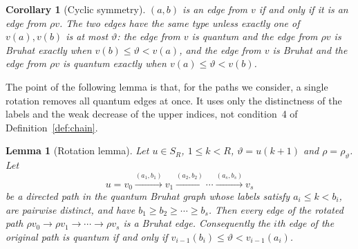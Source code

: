 \documentclass[11pt]{article}
\newtheorem{lemma}[proposition]{Lemma}
\newtheorem{corollary}[proposition]{Corollary}
\begin{document}
\begin{corollary}[Cyclic symmetry]\label{cor:cyclic}
$(a,b)$ is an edge from $v$ if and only if it is an edge from
$\rho v$. The two edges have the same type unless exactly one of
$v(a),v(b)$ is at most $\vartheta$: the edge from $v$ is quantum and
the edge from $\rho v$ is Bruhat exactly when
$v(b)\leq\vartheta<v(a)$, and the edge from $v$ is Bruhat and the edge
from $\rho v$ is quantum exactly when $v(a)\leq\vartheta<v(b)$.
\end{corollary}

The point of the following lemma is that, for the paths we consider,
a single rotation removes all quantum edges at once. It uses only the
distinctness of the labels and the weak decrease of the upper
indices, not condition~4 of Definition~\ref{def:chain}.

\begin{lemma}[Rotation lemma]\label{lem:rotation}
Let $u\in S_R$, $1\leq k<R$, $\vartheta=u(k+1)$ and $\rho=\rho_\vartheta$.
Let
\[
 u=v_0\xrightarrow{(a_1,b_1)}v_1\xrightarrow{(a_2,b_2)}\cdots
   \xrightarrow{(a_s,b_s)}v_s
\]
be a directed path in the quantum Bruhat graph whose labels satisfy
$a_i\leq k<b_i$, are pairwise distinct, and have
$b_1\geq b_2\geq\cdots\geq b_s$. Then every edge of the rotated path
$\rho v_0\to\rho v_1\to\cdots\to\rho v_s$ is a Bruhat edge.
Consequently the $i$th edge of the original path is quantum if and
only if $v_{i-1}(b_i)\leq\vartheta<v_{i-1}(a_i)$.
\end{lemma}
\end{document}
